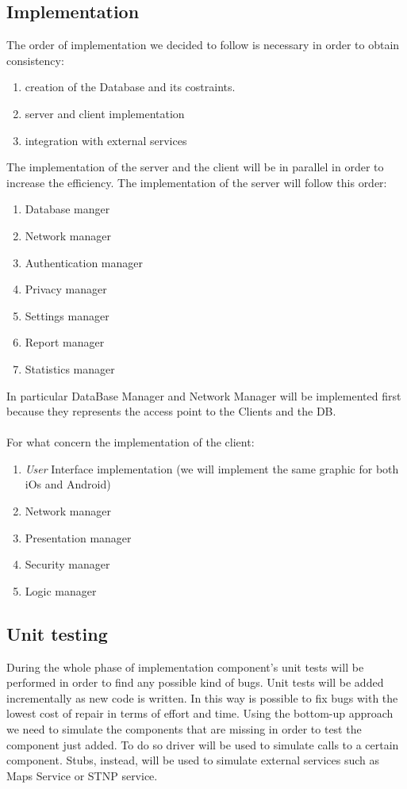 \documentclass{article}
\begin{document}
\subsection{Implementation}
The order of implementation we decided to follow is necessary in order to obtain consistency:
\begin{enumerate}
    \item creation of the Database and its costraints.
    \item server and client implementation
    \item integration with external services
\end{enumerate}
The implementation of the server and the client will be in parallel in order to increase the efficiency.
The implementation of the server will follow this order:
\begin{enumerate}
    \item Database manger
    \item Network manager 
    \item Authentication manager 
    \item Privacy manager
    \item Settings manager
    \item Report manager
    \item Statistics manager
\end{enumerate}
In particular DataBase Manager and Network Manager will be implemented first because they represents the access 
point to the Clients and the DB. 
\\
\\
For what concern the implementation of the client:
\begin{enumerate}
    \item \textit{User} Interface implementation (we will implement the same graphic for both iOs and Android)
    \item Network manager
    \item Presentation manager
    \item Security manager
    \item Logic manager
\end{enumerate}
\subsection{Unit testing}
During the whole phase of implementation component's unit tests will be performed in order to find any possible kind of bugs.
Unit tests will be added incrementally as new code is written. In this way is possible to fix bugs with the lowest cost of 
repair in terms of effort and time. Using the bottom-up approach we need to simulate the components that are missing in order
to test the component just added. To do so driver will be used to simulate calls to a certain component. Stubs, instead, will be 
used to simulate external services such as Maps Service or STNP service.    
\end{document}
